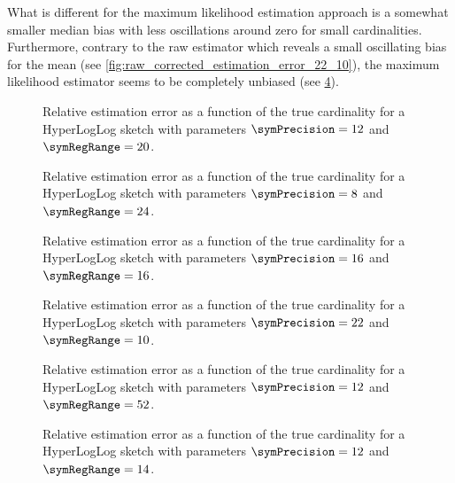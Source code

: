 \documentclass[a4paper]{scrartcl}
\begin{document}
What is different for the maximum likelihood estimation approach is a somewhat smaller median bias with less oscillations around zero for small cardinalities. Furthermore, contrary to the raw estimator which reveals a small oscillating bias for the mean (see \cref{fig:raw_corrected_estimation_error_22_10}), the maximum likelihood estimator seems to be completely unbiased (see \cref{fig:estimation_error_22_10}).

\begin{figure}
\centering

\caption{Relative estimation error as a function of the true cardinality for a HyperLogLog sketch with parameters $\symPrecision = 12$ and $\symRegRange=20$.}
\label{fig:estimation_error_12_20}
\end{figure}

\begin{figure}
\centering

\caption{Relative estimation error as a function of the true cardinality for a HyperLogLog sketch with parameters $\symPrecision = 8$ and $\symRegRange=24$.}
\label{fig:estimation_error_8_24}
\end{figure}

\begin{figure}
\centering

\caption{Relative estimation error as a function of the true cardinality for a HyperLogLog sketch with parameters $\symPrecision = 16$ and $\symRegRange=16$.}
\label{fig:estimation_error_16_16}
\end{figure}

\begin{figure}
\centering

\caption{Relative estimation error as a function of the true cardinality for a HyperLogLog sketch with parameters $\symPrecision = 22$ and $\symRegRange=10$.}
\label{fig:estimation_error_22_10}
\end{figure}

\begin{figure}
\centering

\caption{Relative estimation error as a function of the true cardinality for a HyperLogLog sketch with parameters $\symPrecision = 12$ and $\symRegRange=52$.}
\label{fig:estimation_error_12_52}
\end{figure}

\begin{figure}
\centering

\caption{Relative estimation error as a function of the true cardinality for a HyperLogLog sketch with parameters $\symPrecision = 12$ and $\symRegRange=14$.}
\label{fig:estimation_error_12_14}
\end{figure}
\end{document}
